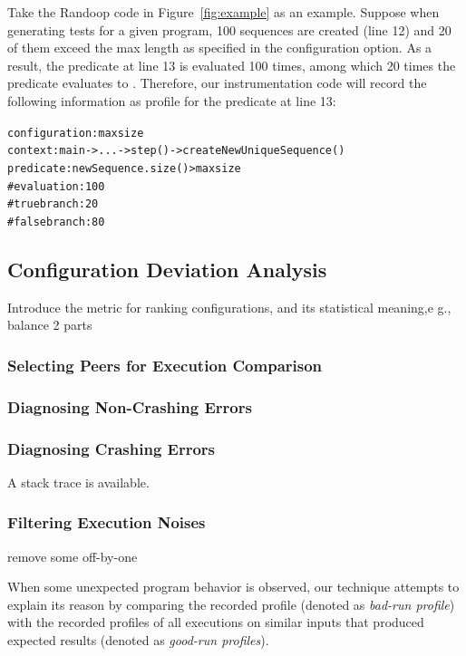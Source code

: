 Take the Randoop code in Figure~\ref{fig:example} as an example. Suppose when
generating tests for a given program, 100 sequences are created (line 12) and 20
of them exceed the max length as specified in the  configuration option.
As a result, the predicate at line 13 is evaluated 100 times, among which 20 times the
predicate evaluates to . Therefore,
our instrumentation code will record the following information as profile for the predicate
at line 13:


\begin{CodeOut}
\begin{alltt}
configuration: maxsize
context: main -> ... -> step() - > createNewUniqueSequence()
predicate: newSequence.size() > maxsize
    \# evaluation: 100
    \# true branch: 20
    \# false branch: 80
\end{alltt}
\end{CodeOut}

\subsection{Configuration Deviation Analysis}
\label{sec:analysis}


Introduce the metric for ranking configurations, and its
statistical meaning,e g., balance 2 parts

\subsubsection{Selecting Peers for Execution Comparison}

\subsubsection{Diagnosing Non-Crashing Errors}

\subsubsection{Diagnosing Crashing Errors}

A stack trace is available.

\subsubsection{Filtering Execution Noises}

remove some off-by-one


When some unexpected program behavior is observed, our technique
attempts to explain its reason by comparing the recorded profile (denoted
as \textit{bad-run profile}) with the recorded profiles of all
executions on similar inputs that produced expected results (denoted as \textit{good-run profiles}).

